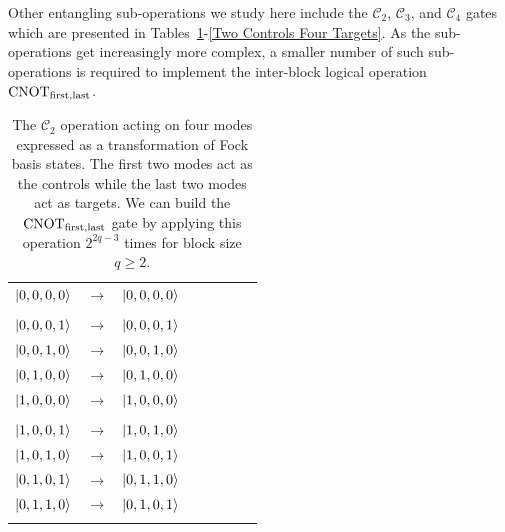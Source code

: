 \documentclass[aps,pra,twocolumn,showpacs,superscriptaddress,floatfix,10pt]{revtex4}
\begin{document}
Other entangling sub-operations we study here include the $\mathcal{C}_2$, $\mathcal{C}_3$, and $\mathcal{C}_4$ gates which are presented in Tables~\ref{Two Controls Two Targets}-\ref{Two Controls Four Targets}. As the sub-operations get increasingly more complex, a smaller number of such sub-operations is required to implement the inter-block logical operation  $\mbox{CNOT}_{\rm first,last}$.
\begin {table}[h]
\begin{center}
	\begin{tabular}{l*{6}{c}r} 
		$\ket{0,0,0,0}$  &  $\rightarrow$ & $\ket{0,0,0,0}$ \\ \\
		$\ket{0,0,0,1}$  & $\rightarrow$ & $\ket{0,0,0,1}$ \\
		$\ket{0,0,1,0}$ & $\rightarrow$ & $\ket{0,0,1,0}$ \\
		$\ket{0,1,0,0}$ & $\rightarrow$ & $\ket{0,1,0,0} $ \\ 
		$\ket{1,0,0,0}$ & $\rightarrow$ & $\ket{1,0,0,0} $ \\ \\
		$\ket{1,0,0,1}$  & $\rightarrow$ & $\ket{1,0,1,0}$ \\
		$\ket{1,0,1,0}$ & $\rightarrow$ & $\ket{1,0,0,1}$ \\
		$\ket{0,1,0,1}$ & $\rightarrow$ & $\ket{0,1,1,0} $ \\ 
		$\ket{0,1,1,0}$ & $\rightarrow$ & $\ket{0,1,0,1} $ \\ \\
	\end{tabular}
	\caption{ \label{Two Controls Two Targets} The $\mathcal{C}_2$  operation acting on four modes expressed as a transformation of Fock basis states. The first two modes act as the controls while the last two modes act as targets. We can build the $\mbox{CNOT}_{\rm first,last}$ gate by applying this operation $2^{2 q - 3}$ times for block size $ q \ge 2 $.}
\end{center}
\end{table}
\end{document}
